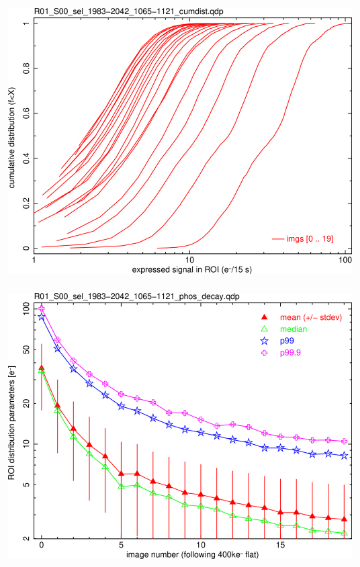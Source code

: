 \begin{figure}[!htbp]
\begin{subfigure}{0.45\textwidth}
  \centering
  \includegraphics[width=\textwidth]{figures/phosphorescence-survey/phos_kinetics/R01_S00_sel_1983-2042_1065-1121_cumdist.png}    
\end{subfigure}
\hfil
\begin{subfigure}{0.45\textwidth}
  \centering
  \includegraphics[width=\textwidth]{figures/phosphorescence-survey/phos_kinetics/R01_S00_sel_1983-2042_1065-1121_phos_decay.png}
\end{subfigure}
\newline
\begin{subfigure}{0.45\textwidth}    
  \centering

\end{subfigure}
\end{figure}
